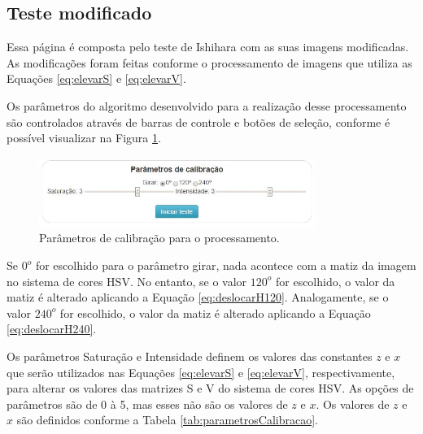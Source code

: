 \documentclass[	12pt, Times, openright, twoside, a4paper, english, brazil]{abntex2}
\begin{document}
\subsection{Teste modificado}
\label{subsec:testeModificado}

Essa página é composta pelo teste de Ishihara com as suas imagens modificadas. As modificações foram feitas conforme o processamento de imagens que utiliza as Equações \ref{eq:elevarS} e \ref{eq:elevarV}.

Os parâmetros do algoritmo desenvolvido para a realização desse processamento são controlados através de barras de controle e botões de seleção, conforme é possível visualizar na Figura \ref{fig:figuraParametrosTeste}. 

\begin{figure}[!htb]
\centering \includegraphics[width=0.8\textwidth]{figuraParametrosCalibracao.jpg}
\caption{Parâmetros de calibração para o processamento.} \label{fig:figuraParametrosTeste}
\end{figure}

Se $0^o$ for escolhido para o parâmetro girar, nada acontece com a matiz da imagem no sistema de cores HSV. No entanto, se o valor $120^o$ for escolhido, o valor da matiz é alterado aplicando a Equação \ref{eq:deslocarH120}. Analogamente, se o valor $240^o$ for escolhido, o valor da matiz é alterado aplicando a Equação \ref{eq:deslocarH240}.

Os parâmetros Saturação e Intensidade definem os valores das constantes $z$ e $x$ que serão utilizados nas Equações \ref{eq:elevarS} e \ref{eq:elevarV}, respectivamente, para alterar os valores das matrizes S e V do sistema de cores HSV. As opções de parâmetros são de 0 à 5, mas esses não são os valores de $z$ e $x$. Os valores de $z$ e $x$ são definidos conforme a Tabela \ref{tab:parametrosCalibracao}.
\end{document}
